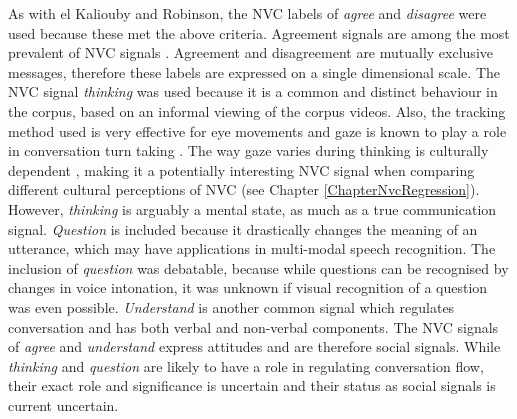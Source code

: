 As with el Kaliouby and Robinson, the \ac{NVC} labels of \textit{agree} and \textit{disagree} were used because these met the above criteria. Agreement signals are among the most prevalent of \ac{NVC} signals \cite{Bousmalis2009}. Agreement and disagreement are mutually exclusive messages, therefore these labels are expressed on a single dimensional scale. 
The \ac{NVC} signal \textit{thinking} was used because it is a common and distinct behaviour in the corpus, based on an informal viewing of the corpus videos. Also, the tracking method used is very effective for eye movements and gaze is known to play a role in conversation turn taking \cite{Argyle1976}. The way gaze varies during thinking is culturally dependent \cite{McCarthy2006}, making it a potentially interesting \ac{NVC} signal when comparing different cultural perceptions of \ac{NVC} (see Chapter \ref{ChapterNvcRegression}). However, \textit{thinking} is arguably a mental state, as much as a true communication signal. 
 \textit{Question} is included because it drastically changes the meaning of an utterance, which may have applications in multi-modal speech recognition. The inclusion of \textit{question} was debatable, because while questions can be recognised by changes in voice intonation, it was unknown if visual recognition of a question was even possible. \textit{Understand} is another common signal which regulates conversation and has both verbal and non-verbal components. 
The \ac{NVC} signals of \textit{agree} and \textit{understand} express attitudes and are therefore social signals. While \textit{thinking} and \textit{question} are likely to have a role in regulating conversation flow, their exact role and significance is uncertain and their status as social signals is current uncertain.

